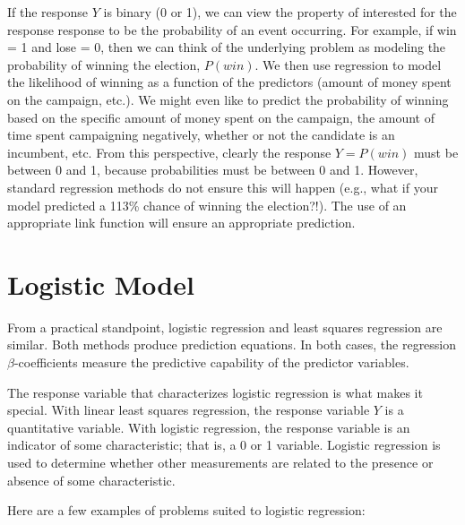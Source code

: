 \documentclass[
]{book}
\begin{document}
If the response \(Y\) is binary (0 or 1), we can view the property of interested for the response response to be the probability of an event occurring. For example, if win = 1 and lose = 0, then we can think of the underlying problem as modeling the probability of winning the election, \(P(win)\). We then use regression to model the likelihood of winning as a function of the predictors (amount of money spent on the campaign, etc.). We might even like to predict the probability of winning based on the specific amount of money spent on the campaign, the amount of time spent campaigning negatively, whether or not the candidate is an incumbent, etc. From this perspective, clearly the response \(Y = P(win)\) must be between 0 and 1, because probabilities must be between 0 and 1. However, standard regression methods do not ensure this will happen (e.g., what if your model predicted a 113\% chance of winning the election?!). The use of an
appropriate link function will ensure an appropriate prediction.

\hypertarget{logistic-model}{%
\section{Logistic Model}\label{logistic-model}}

From a practical standpoint, logistic regression and least squares regression are similar. Both methods produce prediction equations. In both cases, the regression \(\beta\)-coefficients measure the predictive capability of the predictor variables.

The response variable that characterizes logistic regression is what makes it special. With linear least squares regression, the response variable \(Y\) is a quantitative variable. With logistic regression, the response variable is an indicator of some characteristic; that is, a 0 or 1 variable. Logistic regression is used to determine whether other measurements are related to the presence or absence of some characteristic.

Here are a few examples of problems suited to logistic regression:
\end{document}
